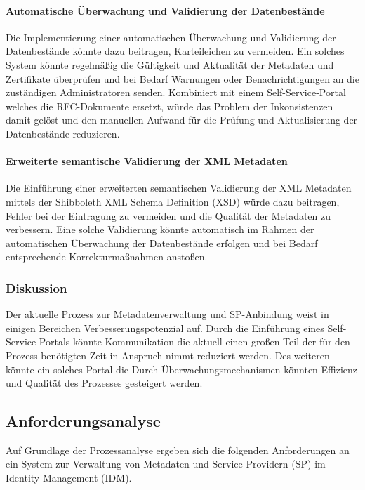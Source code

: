 \documentclass[a4paper, fontsize=11pt]{scrartcl}
\begin{document}
\paragraph{Automatische Überwachung und Validierung der Datenbestände}
Die Implementierung einer automatischen Überwachung und Validierung der Datenbestände könnte dazu beitragen, Karteileichen zu vermeiden.
Ein solches System könnte regelmäßig die Gültigkeit und Aktualität der Metadaten und Zertifikate überprüfen und bei Bedarf Warnungen oder Benachrichtigungen an die zuständigen Administratoren senden.
Kombiniert mit einem Self-Service-Portal welches die RFC-Dokumente ersetzt, würde das Problem der Inkonsistenzen damit gelöst und den manuellen Aufwand für die Prüfung und Aktualisierung der Datenbestände reduzieren.

\paragraph{Erweiterte semantische Validierung der XML Metadaten}
Die Einführung einer erweiterten semantischen Validierung der XML Metadaten mittels der Shibboleth XML Schema Definition (XSD) würde dazu beitragen, Fehler bei der Eintragung zu vermeiden und die Qualität der Metadaten zu verbessern.
Eine solche Validierung könnte automatisch im Rahmen der automatischen Überwachung der Datenbestände erfolgen und bei Bedarf entsprechende Korrekturmaßnahmen anstoßen.

\subsubsection{Diskussion}\label{subsubsec:prozessanalyse-discussion}
Der aktuelle Prozess zur Metadatenverwaltung und SP-Anbindung weist in einigen Bereichen Verbesserungspotenzial auf.
Durch die Einführung eines Self-Service-Portals könnte Kommunikation die aktuell einen großen Teil der für den Prozess benötigten Zeit in Anspruch nimmt reduziert werden.
Des weiteren könnte ein solches Portal die 
Durch Überwachungsmechanismen könnten Effizienz und Qualität des Prozesses gesteigert werden.

\subsection{Anforderungsanalyse}\label{subsec:anforderungsanalyse-results}
Auf Grundlage der Prozessanalyse ergeben sich die folgenden Anforderungen an ein System zur Verwaltung von Metadaten und Service Providern (SP) im Identity Management (IDM).
\end{document}

